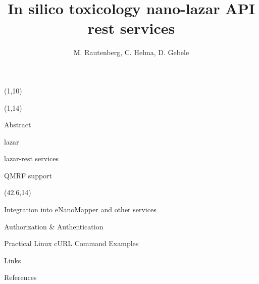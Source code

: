 \documentclass[final]{beamer}
\title{In silico toxicology nano-lazar API rest services}
\author{M. Rautenberg, C. Helma, D. Gebele}
\institute{\emph{in silico} toxicology gmbh, Basel, Switzerland}
\begin{document}
  \begin{frame}{}

    \begin{textblock}{80}(1,10)
        
    \end{textblock}

    \begin{textblock}{40.5}(1,14)
      \begin{block}{Abstract}
        \justifying
        
      \end{block}

      \begin{block}{lazar}
        \justifying
        
      \end{block}

      \begin{block}{lazar-rest services}
        \justifying
        
      \end{block}


      \begin{block}{QMRF support}
        \justifying
        
      \end{block}

    \end{textblock}

    \begin{textblock}{40.5}(42.6,14)

      \begin{block}{Integration into eNanoMapper and other services}
        
      \end{block}

      \begin{block}{Authorization \& Authentication}
        \justifying        
        
      \end{block}

      \begin{alertblock}{Practical Linux cURL Command Examples}
        
      \end{alertblock}

      \begin{exampleblock}{Links}
        
      \end{exampleblock}

      \begin{block}{References}
        \justifying
        \small
      \end{block}

    \end{textblock}

  \end{frame}
\end{document}
